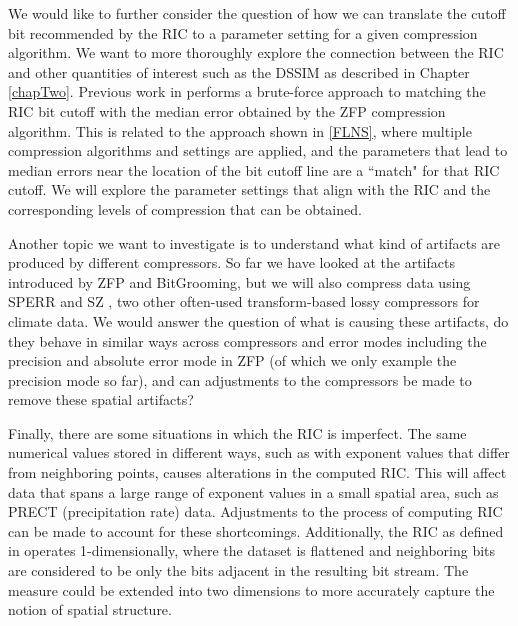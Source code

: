     We would like to further consider the question of how we can translate the cutoff bit recommended by the RIC to a parameter setting for a given compression algorithm. We want to more thoroughly explore the connection between the RIC and other quantities of interest such as the DSSIM as described in Chapter \ref{chapTwo}. Previous work in \cite{klower} performs a brute-force approach to matching the RIC bit cutoff with the median error obtained by the ZFP compression algorithm. This is related to the approach shown in \ref{FLNS}, where multiple compression algorithms and settings are applied, and the parameters that lead to median errors near the location of the bit cutoff line are a ``match" for that RIC cutoff. We will explore the parameter settings that align with the RIC and the corresponding levels of compression that can be obtained.

    
    Another topic we want to investigate is to understand what kind of artifacts are produced by different compressors. So far we have looked at the artifacts introduced by ZFP and BitGrooming, but we will also compress data using SPERR \cite{sperr} and SZ \cite{sheng2016}, two other often-used transform-based lossy compressors for climate data. We would answer the question of what is causing these artifacts, do they behave in similar ways across compressors and error modes including the precision and absolute error mode in ZFP (of which we only example the precision mode so far), and can adjustments to the compressors be made to remove these spatial artifacts? 

    
    Finally, there are some situations in which the RIC is imperfect. The same numerical values stored in different ways, such as with exponent values that differ from neighboring points, causes alterations in the computed RIC. This will affect data that spans a large range of exponent values in a small spatial area, such as PRECT (precipitation rate) data. Adjustments to the process of computing RIC can be made to account for these shortcomings. Additionally, the RIC as defined in \cite{klower} operates 1-dimensionally, where the dataset is flattened and neighboring bits are considered to be only the bits adjacent in the resulting bit stream. The measure could be extended into two dimensions to more accurately capture the notion of spatial structure.

 


